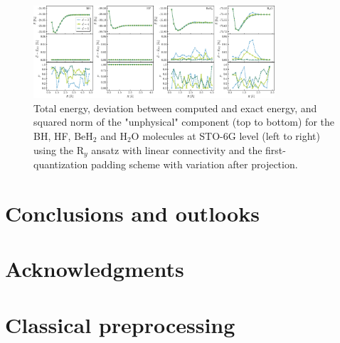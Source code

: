 \documentclass[aps,pra,twocolumn]{revtex4-2}
\begin{document}
\begin{figure}[t!]
\includegraphics[width=0.8\textwidth]{../figures/first_quantization_pad_vap_ry_linear/first_quantization_pad_vap_ry_linear.eps}
\caption{Total energy, deviation between computed and exact energy, and squared norm of the "unphysical" component (top to bottom) 
for the BH, HF, BeH$_2$ and H$_2$O molecules at STO-6G level (left to right) using the R$_y$ ansatz with linear connectivity and the first-quantization padding scheme with variation after projection.}
\label{figure:first_pad_vap_ry}
\end{figure} 

\section{Conclusions and outlooks}
\label{sec:conclusions}

\section*{Acknowledgments}


\appendix

\section{Classical preprocessing}
\label{sec:classical}
\end{document}
